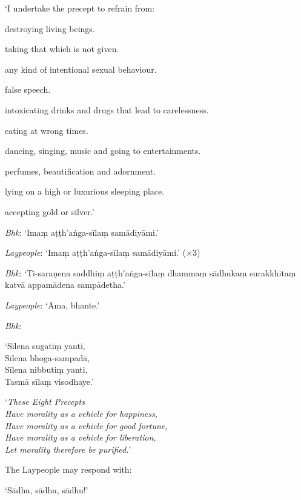 
{\itshape

  ‘I undertake the precept to refrain from:

  \begin{packeditemize}

  \item destroying living beings.
  \item taking that which is not given.
  \item any kind of intentional sexual behaviour.
  \item false speech.
  \item intoxicating drinks and drugs that lead to carelessness.
  \item eating at wrong times.
  \item dancing, singing, music and going to entertainments.
  \item perfumes, beautification and adornment.
  \item lying on a high or luxurious sleeping place.
  \item accepting gold or silver.’

  \end{packeditemize}

}

\emph{Bhk}: ‘Imaṃ aṭṭh'aṅga-sīlaṃ samādiyāmi.’

\emph{Laypeople}: ‘Imaṃ aṭṭh'aṅga-sīlaṃ samādiyāmi.’ (×3)

\emph{Bhk}: ‘Ti-saraṇena saddhiṃ aṭṭh'aṅga-sīlaṃ dhammaṃ sādhukaṃ surakkhitaṃ
katvā appamādena sampādetha.’

\emph{Laypeople}: ‘Āma, bhante.’

\emph{Bhk}:

‘Sīlena sugatiṃ yanti,\\
Sīlena bhoga-sampadā,\\
Sīlena nibbutiṃ yanti,\\
Tasmā sīlaṃ visodhaye.’

‘\emph{These Eight Precepts\\
  Have morality as a vehicle for happiness,\\
  Have morality as a vehicle for good fortune,\\
  Have morality as a vehicle for liberation,\\
  Let morality therefore be purified.}’

The Laypeople may respond with:

‘Sādhu, sādhu, sādhu!’

